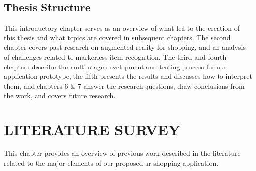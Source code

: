 \documentclass[thesis]{fputhesis}
\begin{document}
\begin{body}
\section{Thesis Structure}
This introductory chapter serves as an overview of what led to the creation of this thesis and what topics are covered in subsequent chapters. The second chapter covers past research on augmented reality for shopping, and an analysis of challenges related to markerless item recognition. The third and fourth chapters describe the multi-stage development and testing process for our application prototype, the fifth presents the results and discusses how to interpret them, and chapters 6 \& 7 answer the research questions, draw conclusions from the work, and covers future research.

\chapter{LITERATURE SURVEY}
This chapter provides an overview of previous work described in the literature related to the major elements of our proposed \acrfull{ar} shopping application. 

\end{body}
\end{document}
